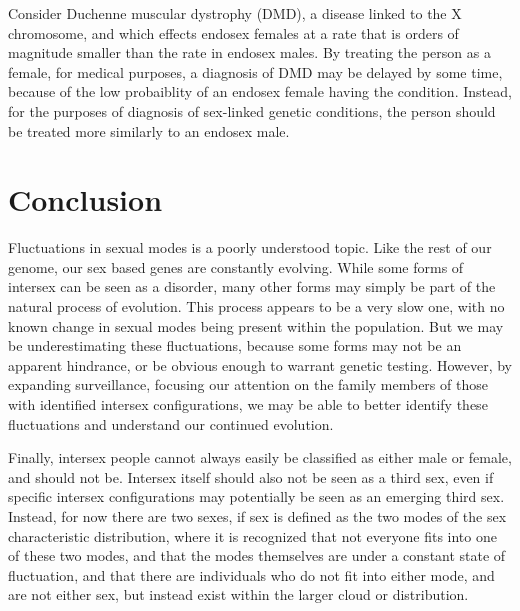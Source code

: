 \documentclass{article}
\begin{document}
Consider Duchenne muscular dystrophy (DMD), a disease linked to the X chromosome, and which effects endosex females at a rate that is orders of magnitude smaller than the rate in endosex males. By treating the person as a female, for medical purposes, a diagnosis of DMD may be delayed by some time, because of the low probaiblity of an endosex female having the condition. Instead, for the purposes of diagnosis of sex-linked genetic conditions, the person should be treated more similarly to an endosex male.
\section{Conclusion}
Fluctuations in sexual modes is a poorly understood topic. Like the rest of our genome, our sex based genes are constantly evolving. While some forms of intersex can be seen as a disorder, many other forms may simply be part of the natural process of evolution. This process appears to be a very slow one, with no known change in sexual modes being present within the population. But we may be underestimating these fluctuations, because some forms may not be an apparent hindrance, or be obvious enough to warrant genetic testing. However, by expanding surveillance, focusing our attention on the family members of those with identified intersex configurations, we may be able to better identify these fluctuations and understand our continued evolution. 

Finally, intersex people cannot always easily be classified as either male or female, and should not be. Intersex itself should also not be seen as a third sex, even if specific intersex configurations may potentially be seen as an emerging third sex. Instead, for now there are two sexes, if sex is defined as the two modes of the sex characteristic distribution, where it is recognized that not everyone fits into one of these two modes, and that the modes themselves are under a constant state of fluctuation, and that there are individuals who do not fit into either mode, and are not either sex, but instead exist within the larger cloud or distribution.
\printbibliography
\end{document}
